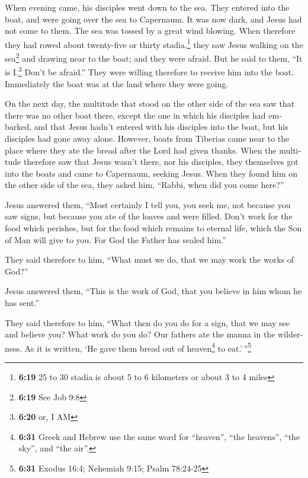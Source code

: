 \begin{paracol}{2}
\begin{otherlanguage}{english}
 When evening came, his disciples went down to the sea.
 They entered into the boat, and were going over the sea
to Capernaum. It was now dark, and Jesus had not come to them.
 The sea was tossed by a great wind blowing.
 When therefore they had rowed about twenty-five or
thirty stadia,\footnote{\textbf{6:19} 25 to 30 stadia is about 5 to 6
  kilometers or about 3 to 4 miles} they saw Jesus walking on the
sea\footnote{\textbf{6:19} See Job 9:8} and drawing near to the boat;
and they were afraid.  But he said to them, ``It is
I.\footnote{\textbf{6:20} or, I AM} Don't be afraid.'' 
They were willing therefore to receive him into the boat. Immediately
the boat was at the land where they were going.

 On the next day, the multitude that stood on the other
side of the sea saw that there was no other boat there, except the one
in which his disciples had embarked, and that Jesus hadn't entered with
his disciples into the boat, but his disciples had gone away alone.
 However, boats from Tiberias came near to the place
where they ate the bread after the Lord had given thanks.
 When the multitude therefore saw that Jesus wasn't
there, nor his disciples, they themselves got into the boats and came to
Capernaum, seeking Jesus.  When they found him on the
other side of the sea, they asked him, ``Rabbi, when did you come
here?''

 Jesus answered them, ``Most certainly I tell you, you
seek me, not because you saw signs, but because you ate of the loaves
and were filled.  Don't work for the food which perishes,
but for the food which remains to eternal life, which the Son of Man
will give to you. For God the Father has sealed him.''

 They said therefore to him, ``What must we do, that we
may work the works of God?''

 Jesus answered them, ``This is the work of God, that you
believe in him whom he has sent.''

 They said therefore to him, ``What then do you do for a
sign, that we may see and believe you? What work do you do?
 Our fathers ate the manna in the wilderness. As it is
written, `He gave them bread out of heaven\footnote{\textbf{6:31} Greek
  and Hebrew use the same word for ``heaven'', ``the heavens'', ``the
  sky'', and ``the air''.} to eat.'\,''\footnote{\textbf{6:31} Exodus
  16:4; Nehemiah 9:15; Psalm 78:24-25}


\end{otherlanguage}
\end{paracol}
